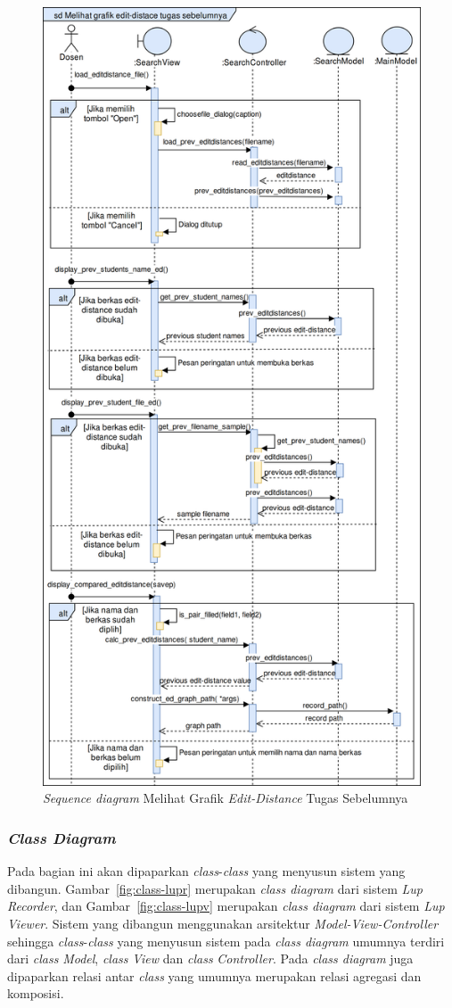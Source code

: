 \begin{figure}[tph]
  \centering
  \includegraphics[width=.8\linewidth]{img/use-case/sd/sd-view-previous-ed-v1_2}
  \caption{\emph{Sequence diagram} Melihat Grafik \emph{Edit-Distance} Tugas
    Sebelumnya}\label{fig:sd-view-previous-ed}
\end{figure}

\subsubsection{\emph{Class Diagram}}

Pada bagian ini akan dipaparkan \emph{class}-\emph{class} yang menyusun sistem yang
dibangun. Gambar~\ref{fig:class-lupr} merupakan \emph{class diagram}
dari sistem \emph{Lup Recorder}, dan Gambar~\ref{fig:class-lupv}
merupakan \emph{class diagram} dari sistem \emph{Lup Viewer}. Sistem
yang dibangun menggunakan arsitektur \emph{Model-View-Controller}
sehingga \emph{class}-\emph{class} yang menyusun sistem pada \emph{class diagram}
umumnya terdiri dari \emph{class} \emph{Model}, \emph{class} \emph{View} dan \emph{class}
\emph{Controller}. Pada \emph{class diagram} juga dipaparkan relasi
antar \emph{class} yang umumnya merupakan relasi agregasi dan komposisi.

